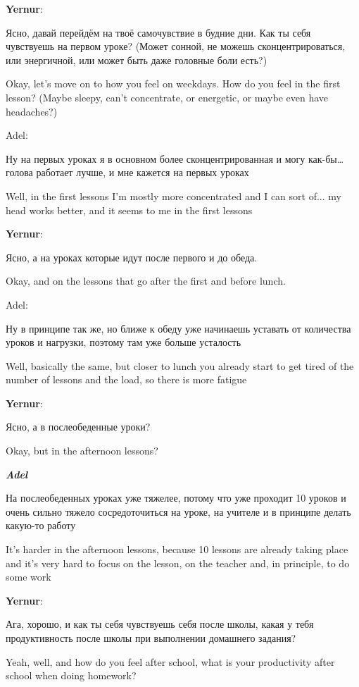 \textbf{Yernur}: 

Ясно, давай перейдём на твоё самочувствие в будние дни. Как ты себя чувствуешь на первом уроке? (Может сонной, не можешь сконцентрироваться, или энергичной, или может быть даже головные боли есть?)

Okay, let's move on to how you feel on weekdays. How do you feel in the first lesson? (Maybe sleepy, can't concentrate, or energetic, or maybe even have headaches?)

Adel:

Ну на первых уроках я в основном более сконцентрированная и могу как-бы… голова работает лучше, и мне кажется на первых уроках

Well, in the first lessons I'm mostly more concentrated and I can sort of... my head works better, and it seems to me in the first lessons

\textbf{Yernur}: 

Ясно, а на уроках которые идут после первого и до обеда.

Okay, and on the lessons that go after the first and before lunch.

Adel:

Ну в принципе так же, но ближе к обеду уже начинаешь уставать от количества уроков и нагрузки, поэтому там уже больше усталость 

Well, basically the same, but closer to lunch you already start to get tired of the number of lessons and the load, so there is more fatigue

\textbf{Yernur}: 

Ясно, а в послеобеденные уроки?

Okay, but in the afternoon lessons?

\textbf{\textit{Adel}}

На послеобеденных уроках уже тяжелее, потому что уже проходит 10 уроков и очень сильно тяжело сосредоточиться на уроке, на учителе и в принципе делать какую-то работу

It's harder in the afternoon lessons, because 10 lessons are already taking place and it's very hard to focus on the lesson, on the teacher and, in principle, to do some work

\textbf{Yernur}: 

Ага, хорошо, и как ты себя чувствуешь себя после школы, какая у тебя продуктивность после школы при выполнении домашнего задания?

Yeah, well, and how do you feel after school, what is your productivity after school when doing homework?

